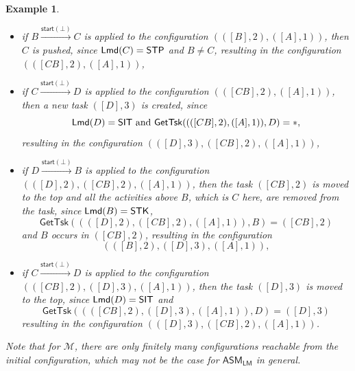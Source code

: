 \documentclass[preprint,12pt]{elsarticle}
\newtheorem{example}{Example}
\newcommand\Mm{{\mathcal{M} }}
\newcommand\lmd{{\sf Lmd}}
\newcommand{\LMAMASS}{\textsf{ASM}_\textsf{LM}}
\newcommand\startactivity{{\mathsf{start} }}
\newcommand{\STK}{\mathsf{STK}}
\newcommand{\SIT}{\mathsf{SIT}}
\newcommand{\STP}{\mathsf{STP}}
\newcommand\gettsk{\mathsf{GetTsk}}
\begin{document}
\begin{example}
\begin{itemize}
			\item if $B \xrightarrow{\startactivity(\bot)} C$ is applied to the configuration $(([B],2),([A],1))$, then $C$ is pushed, since $\lmd(C) = \STP$ and $B\neq C$, resulting in the configuration $(([CB],2),([A],1))$,
			\item if $C \xrightarrow{\startactivity(\bot)} D$ is applied to the configuration $(([CB],2),([A],1))$, then a new task $([D], 3)$ is created, since 
			$$\lmd(D) = \SIT \mbox{ and } \gettsk((([CB],2),([A],1)), D) = *,$$ 
			resulting in the configuration $(([D],3),([CB],2),([A],1))$,
			\item if $D \xrightarrow{\startactivity(\bot)} B$ is applied to the configuration $(([D],2),([CB],2),([A],1))$, then the task $([CB],2)$ is moved to the top and all the activities above $B$, which is $C$ here, are removed from the task, since $\lmd(B) = \STK$, 
			$$\gettsk((([D],2),([CB],2),([A],1)), B) = ([CB],2)$$
			and $B$ occurs in $([CB], 2)$, resulting in the configuration 
			$$(([B],2),([D],3),([A],1)),$$
			\item if $C \xrightarrow{\startactivity(\bot)} D$ is applied to the configuration $(([CB],2),([D],3),([A],1))$, then the task $([D],3)$ is moved to the top, since $\lmd(D) = \SIT$ and
			$$\gettsk((([CB],2),([D],3),([A],1)), D) = ([D],3)$$
			resulting in the configuration $(([D],3),([CB],2),([A],1))$.
		\end{itemize}
		Note that for $\Mm$, there are only finitely many configurations reachable from the initial configuration, which may not be the case for $\LMAMASS$ in general.  

\end{example}
\end{document}
